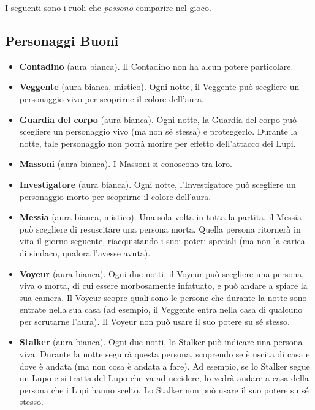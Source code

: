 \documentclass[a4paper,10pt]{article}
\begin{document}
I seguenti sono i ruoli che \emph{possono} comparire nel gioco.


\subsection*{Personaggi Buoni}

\begin{itemize}
 \item {\bf Contadino} (aura bianca). Il Contadino non ha alcun potere particolare.
 
 \item {\bf Veggente} (aura bianca, mistico). Ogni notte, il Veggente può scegliere un personaggio vivo per scoprirne il colore dell'aura.

 \item {\bf Guardia del corpo} (aura bianca). Ogni notte, la Guardia del corpo può scegliere un personaggio vivo (ma non sé stessa) e proteggerlo. Durante la notte, tale personaggio non potrà morire per effetto dell'attacco dei Lupi.
 
 \item {\bf Massoni} (aura bianca). I Massoni si conoscono tra loro.
 
 \item {\bf Investigatore} (aura bianca). Ogni notte, l'Investigatore può scegliere un personaggio morto per scoprirne il colore dell'aura.

 \item {\bf Messia} (aura bianca, mistico). Una sola volta in tutta la partita, il Messia può scegliere di resuscitare una persona morta. Quella persona ritornerà in vita il giorno seguente, riacquistando i suoi poteri speciali (ma non la carica di sindaco, qualora l'avesse avuta).

 \item {\bf Voyeur} (aura bianca). Ogni due notti, il Voyeur può scegliere una persona, viva o morta, di cui essere morbosamente infatuato, e può andare a spiare la sua camera. Il Voyeur scopre quali sono le persone che durante la notte sono entrate nella sua casa (ad esempio, il Veggente entra nella casa di qualcuno per scrutarne l'aura).
 Il Voyeur non può usare il suo potere su sé stesso.

 \item {\bf Stalker} (aura bianca). Ogni due notti, lo Stalker può indicare una persona viva. Durante la notte seguirà questa persona, scoprendo se è uscita di casa e dove è andata (ma non cosa è andata a fare).
 Ad esempio, se lo Stalker segue un Lupo e si tratta del Lupo che va ad uccidere, lo vedrà andare a casa della persona che i Lupi hanno scelto.
 Lo Stalker non può usare il suo potere su sé stesso.
 

\end{itemize}
\end{document}
